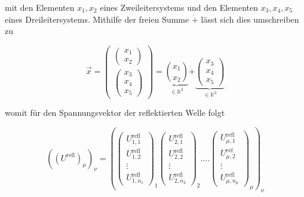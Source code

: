 mit den Elementen $x_{1}, x_{2}$ eines Zweileitersystems und den Elementen $x_{3}, x_{4}, x_{5}$ eines Dreileitersystems. Mithilfe der freien Summe $\dot{+}$ lässt sich dies umschreiben zu

\begin{equation}
	\vec{x}=\begin{pmatrix}\begin{pmatrix}{x_{1}}\\{x_{2}}\end{pmatrix}\\\begin{pmatrix}
			x_{3}  \\
			x_{4} \\
			x_{5}
	\end{pmatrix}\end{pmatrix}=\underbrace{\binom{x_{1}}{x_{2}}}_{\in \mathbb{K}^{2}}\dot{+}\underbrace{\left(\begin{array}{l}
			x_{3} \\
			x_{4} \\
			x_{5}
		\end{array}\right)}_{\in \mathbb{K}^{3}}
\end{equation}

womit für den Spannungsvektor der reflektierten Welle folgt

\begin{equation}
	\left(\left(U^{\mathrm{refl}}\right)_{\mu}\right)_{\nu}=\left(\left(\begin{array}{c}
		U_{1,1}^{\mathrm{refl}}  \\
		U_{1,2}^{\mathrm{refl}} \\
		\vdots \\
		U_{1, n_{1}}^{\mathrm{refl}}
	\end{array}\right)_{1}\left(\begin{array}{c}
		U_{2,1}^{\mathrm{refl}} \\
		U_{2,2}^{\mathrm{refl}} \\
		\vdots \\
		U_{2, n_{2}}^{\mathrm{refl}}
	\end{array}\right)_{2} \ldots .\left(\begin{array}{c}
		U_{\mu, 1}^{\mathrm{refl}} \\
		U_{\mu, 2}^{\mathrm{ref}} \\
		\vdots \\
		U_{\mu, n_{\mu}}^{\mathrm{refl}}
	\end{array}\right)_{\mu}\right)_{\nu}
\end{equation}

